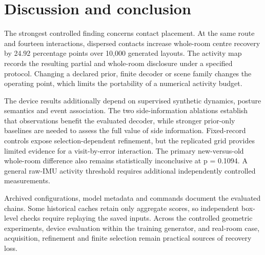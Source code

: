 \documentclass[10pt,twocolumn,letterpaper]{article}
\begin{document}
\section{Discussion and conclusion}\label{discussion-and-conclusion}

The strongest controlled finding concerns contact placement. At the same
route and fourteen interactions, dispersed contacts increase whole-room
centre recovery by 24.92 percentage points over 10,000 generated
layouts. The activity map records the resulting partial and whole-room
disclosure under a specified protocol. Changing a declared prior, finite
decoder or scene family changes the operating point, which limits the
portability of a numerical activity budget.

The device results additionally depend on supervised synthetic dynamics,
posture semantics and event association. The two side-information
ablations establish that observations benefit the evaluated decoder,
while stronger prior-only baselines are needed to assess the full value
of side information. Fixed-record controls expose selection-dependent
refinement, but the replicated grid provides limited evidence for a
visit-by-error interaction. The primary new-versus-old whole-room
difference also remains statistically inconclusive at p = 0.1094. A
general raw-IMU activity threshold requires additional independently
controlled measurements.

Archived configurations, model metadata and commands document the
evaluated chains. Some historical caches retain only aggregate scores,
so independent box-level checks require replaying the saved inputs.
Across the controlled geometric experiments, device evaluation within
the training generator, and real-room case, acquisition, refinement and
finite selection remain practical sources of recovery loss.

\FloatBarrier
\end{document}
